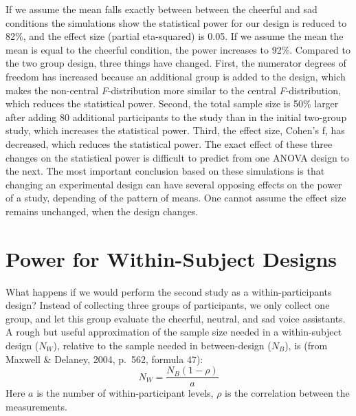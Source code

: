 \documentclass[,jou,floatsintext]{apa6}
\begin{document}
If we assume the mean falls exactly between between the cheerful and sad conditions the simulations show the statistical power for our design is reduced to 82\%, and the effect size (partial eta-squared) is 0.05.
If we assume the mean the mean is equal to the cheerful condition, the power increases to 92\%.
Compared to the two group design, three things have changed.
First, the numerator degrees of freedom has increased because an additional group is added to the design, which makes the non-central \emph{F}-distribution more similar to the central \emph{F}-distribution, which reduces the statistical power.
Second, the total sample size is 50\% larger after adding 80 additional participants to the study than in the initial two-group study, which increases the statistical power.
Third, the effect size, Cohen's f, has decreased, which reduces the statistical power.
The exact effect of these three changes on the statistical power is difficult to predict from one ANOVA design to the next.
The most important conclusion based on these simulations is that changing an experimental design can have several opposing effects on the power of a study, depending of the pattern of means.
One cannot assume the effect size remains unchanged, when the design changes.

\hypertarget{power-for-within-subject-designs}{%
\section{Power for Within-Subject Designs}\label{power-for-within-subject-designs}}

What happens if we would perform the second study as a within-participants design?
Instead of collecting three groups of participants, we only collect one group, and let this group evaluate the cheerful, neutral, and sad voice assistants.
A rough but useful approximation of the sample size needed in a within-subject design (\(N_W\)), relative to the sample needed in between-design (\(N_B\)), is (from Maxwell \& Delaney, 2004, p.~562, formula 47):
\begin{equation}
N_{W}=\frac{N_{B}(1-\rho)}{a} \label{eq:within-n}
\end{equation}
Here \(a\) is the number of within-participant levels, \(\rho\) is the correlation between the measurements.
\end{document}
